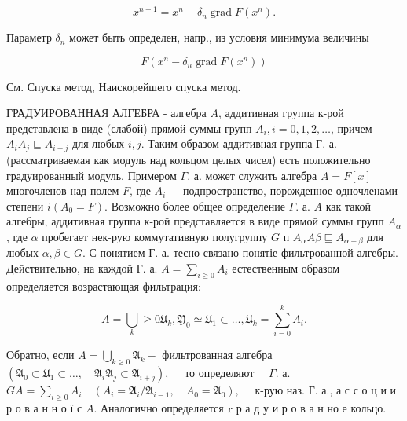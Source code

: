 \documentclass[10pt]{article}
\begin{document}
\[

x^{n+1}=x^{n}-\delta_{n} \operatorname{grad} F\left(x^{n}\right) .

\]



Параметр $\delta_{n}$ может быть определен, напр., из условия минимума величины



\[

F\left(x^{n}-\delta_{n} \operatorname{grad} F\left(x^{n}\right)\right)

\]



См. Спуска метод, Наискорейшего спуска метод.



ГРАДУИРОВАННАЯ АЛГЕБРА - алгебра $A$, аддитивная группа к-рой представлена в виде (слабой) прямой суммы групп $A_{i}, i=0,1,2, \ldots$, причем $A_{i} A_{j} \sqsubseteq A_{i+j}$ для любых $i, j$. Таким образом аддитивная группа Г. а. (рассматриваемая как модуль над кольцом целых чисел) есть положительно градуированный модуль. Примером $\Gamma$. а. может служить алгебра $A=F[x]$ многочленов над полем $F$, где $A_{i}-$ подпространство, порожденное одночленами степени $i\left(A_{0}=F\right)$. Возможно более общее определение $\Gamma$. а. $A$ как такой алгебры, аддитивная группа к-рой представляется в виде прямой суммы групп $A_{\alpha}$, где $\alpha$ пробегает нек-рую коммутативную полугруппу $G$ п $A_{\alpha} A \beta \sqsubseteq A_{\alpha+\beta}$ для любых $\alpha, \beta \in G$. С понятием Г. а. тесно связано понятіе фильтрованной алгебры. Действительно, на каждой Г. а. $A=\sum_{i \geqslant 0} A_{i}$ естественным образом определяется возрастающая фильтрация:



\[

A=\bigcup_{k} \geqslant 0 \mathfrak{U}_{k}, \mathfrak{Y}_{0} \simeq \mathfrak{U}_{1} \subset \ldots, \mathfrak{U}_{k}=\sum_{i=0}^{k} A_{i} .

\]



Обратно, если $A=\bigcup_{k \geqslant 0} \mathfrak{A}_{k}-$ фильтрованная алгебра $\left(\mathfrak{A}_{0} \subset \mathfrak{U}_{1} \subset \ldots, \quad \mathfrak{A}_{i} \mathfrak{A}_{j} \subset \mathfrak{A}_{i+j}\right), \quad$ то определяют $\quad \Gamma$. а. $G A=\sum_{i \geqslant 0} A_{i} \quad\left(A_{i}=\mathfrak{A}_{i} / \mathfrak{A}_{i-1}, \quad A_{0}=\mathfrak{A}_{0}\right), \quad$ к-рую наз. Г. а., а с с о ц и и р о в а н н о ї с $A$. Аналогично определяется $\mathbf{r}$ р а д у и р о в а н но е кольцо.
\end{document}
